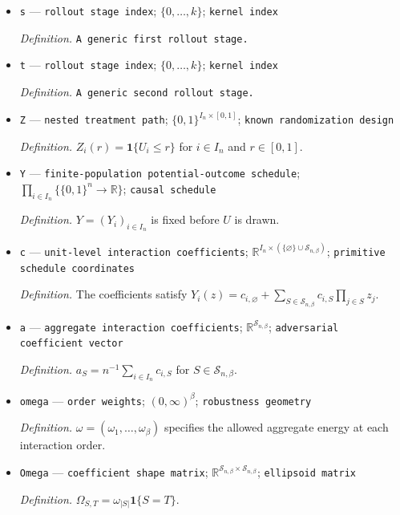\documentclass{article}
\begin{document}
\begin{itemize}
  \item \texttt{s} --- \texttt{rollout stage index}; \(\{0,\ldots,k\}\); \texttt{kernel index}
  \par\smallskip\noindent\emph{Definition.} \texttt{A generic first rollout stage.}
  \item \texttt{t} --- \texttt{rollout stage index}; \(\{0,\ldots,k\}\); \texttt{kernel index}
  \par\smallskip\noindent\emph{Definition.} \texttt{A generic second rollout stage.}
  \item \texttt{Z} --- \texttt{nested treatment path}; \(\{0,1\}^{I_n\times[0,1]}\); \texttt{known randomization design}
  \par\smallskip\noindent\emph{Definition.} \(Z_i(r)=\mathbf 1\{U_i\le r\}\) for \(i\in I_n\) and \(r\in[0,1]\).
  \item \texttt{Y} --- \texttt{finite-\allowbreak{}population potential-\allowbreak{}outcome schedule}; \(\prod_{i\in I_n}\{\{0,1\}^n\to\mathbb R\}\); \texttt{causal schedule}
  \par\smallskip\noindent\emph{Definition.} \(Y=(Y_i)_{i\in I_n}\) is fixed before \(U\) is drawn.
  \item \texttt{c} --- \texttt{unit-\allowbreak{}level interaction coefficients}; \(\mathbb R^{I_n\times(\{\varnothing\}\cup\mathcal S_{n,\beta})}\); \texttt{primitive schedule coordinates}
  \par\smallskip\noindent\emph{Definition.} The coefficients satisfy \(Y_i(z)=c_{i,\varnothing}+\sum_{S\in\mathcal S_{n,\beta}}c_{i,S}\prod_{j\in S}z_j\).
  \item \texttt{a} --- \texttt{aggregate interaction coefficients}; \(\mathbb R^{\mathcal S_{n,\beta}}\); \texttt{adversarial coefficient vector}
  \par\smallskip\noindent\emph{Definition.} \(a_S=n^{-1}\sum_{i\in I_n}c_{i,S}\) for \(S\in\mathcal S_{n,\beta}\).
  \item \texttt{omega} --- \texttt{order weights}; \((0,\infty)^\beta\); \texttt{robustness geometry}
  \par\smallskip\noindent\emph{Definition.} \(\omega=(\omega_1,\ldots,\omega_\beta)\) specifies the allowed aggregate energy at each interaction order.
  \item \texttt{Omega} --- \texttt{coefficient shape matrix}; \(\mathbb R^{\mathcal S_{n,\beta}\times\mathcal S_{n,\beta}}\); \texttt{ellipsoid matrix}
  \par\smallskip\noindent\emph{Definition.} \(\Omega_{S,T}=\omega_{|S|}\mathbf 1\{S=T\}\).

\end{itemize}
\end{document}
